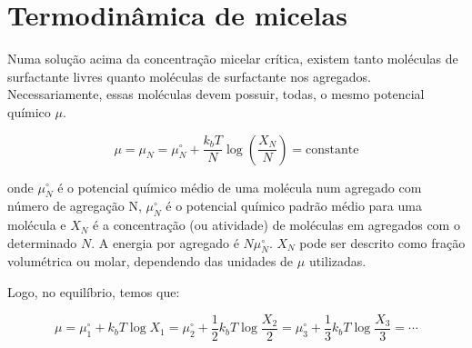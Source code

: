 		
		\section{Termodinâmica de micelas}
		
		Numa solução acima da concentração micelar crítica, existem tanto moléculas de surfactante livres quanto moléculas de surfactante nos agregados. Necessariamente, essas moléculas devem possuir, todas, o mesmo potencial químico \(\mu\). %
		
		\begin{equation}
			\mu = \mu_N = \mu_N^\circ + \dfrac{k_b T}{N} \log \left( \dfrac{X_N}{N} \right) = \mathrm{constante}
			\label{eqn:potencial_quimico_micelas}
		\end{equation}
		
		\noindent onde \(\mu_N^\circ\) é o potencial químico médio de uma molécula num agregado com número de agregação N, \(\mu_N^\circ\) é o potencial químico padrão médio para uma molécula e \(X_N\) é a concentração (ou atividade) de moléculas em agregados com o determinado \(N\). A energia por agregado é \(N\mu_N^\circ\). \(X_N\) pode ser descrito como fração volumétrica ou molar, dependendo das unidades de \(\mu\) utilizadas.
		
		Logo, no equilíbrio, temos que:
		
		\begin{equation}
			\mu = \mu_1^\circ + k_b T \log X_1 = \mu_2^\circ + \dfrac{1}{2} k_b T \log \dfrac{X_2}{2} = \mu_3^\circ + \dfrac{1}{3} k_b T \log \dfrac{X_3}{3} = \cdots
		\end{equation}
		
%		
%		
%		
%		
	

